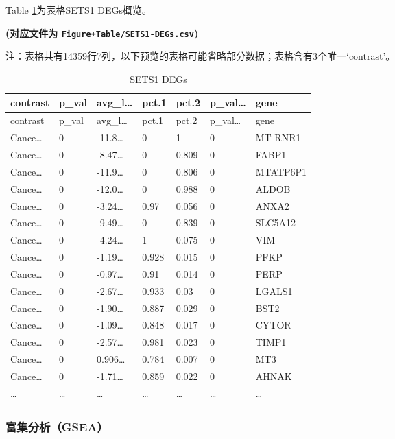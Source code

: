 \documentclass[
]{article}
\begin{document}
Table \ref{tab:SETS1-DEGs}为表格SETS1 DEGs概览。

\textbf{(对应文件为 \texttt{Figure+Table/SETS1-DEGs.csv})}

\begin{center}\begin{tcolorbox}[colback=gray!10, colframe=gray!50, width=0.9\linewidth, arc=1mm, boxrule=0.5pt]注：表格共有14359行7列，以下预览的表格可能省略部分数据；表格含有3个唯一`contrast'。
\end{tcolorbox}
\end{center}

\begin{longtable}[]{@{}lllllll@{}}
\caption{\label{tab:SETS1-DEGs}SETS1 DEGs}\tabularnewline
\toprule
contrast & p\_val & avg\_l\ldots{} & pct.1 & pct.2 & p\_val\ldots{} & gene\tabularnewline
\midrule
\endfirsthead
\toprule
contrast & p\_val & avg\_l\ldots{} & pct.1 & pct.2 & p\_val\ldots{} & gene\tabularnewline
\midrule
\endhead
Cance\ldots{} & 0 & -11.8\ldots{} & 0 & 1 & 0 & MT-RNR1\tabularnewline
Cance\ldots{} & 0 & -8.47\ldots{} & 0 & 0.809 & 0 & FABP1\tabularnewline
Cance\ldots{} & 0 & -11.9\ldots{} & 0 & 0.806 & 0 & MTATP6P1\tabularnewline
Cance\ldots{} & 0 & -12.0\ldots{} & 0 & 0.988 & 0 & ALDOB\tabularnewline
Cance\ldots{} & 0 & -3.24\ldots{} & 0.97 & 0.056 & 0 & ANXA2\tabularnewline
Cance\ldots{} & 0 & -9.49\ldots{} & 0 & 0.839 & 0 & SLC5A12\tabularnewline
Cance\ldots{} & 0 & -4.24\ldots{} & 1 & 0.075 & 0 & VIM\tabularnewline
Cance\ldots{} & 0 & -1.19\ldots{} & 0.928 & 0.015 & 0 & PFKP\tabularnewline
Cance\ldots{} & 0 & -0.97\ldots{} & 0.91 & 0.014 & 0 & PERP\tabularnewline
Cance\ldots{} & 0 & -2.67\ldots{} & 0.933 & 0.03 & 0 & LGALS1\tabularnewline
Cance\ldots{} & 0 & -1.90\ldots{} & 0.887 & 0.029 & 0 & BST2\tabularnewline
Cance\ldots{} & 0 & -1.09\ldots{} & 0.848 & 0.017 & 0 & CYTOR\tabularnewline
Cance\ldots{} & 0 & -2.57\ldots{} & 0.981 & 0.023 & 0 & TIMP1\tabularnewline
Cance\ldots{} & 0 & 0.906\ldots{} & 0.784 & 0.007 & 0 & MT3\tabularnewline
Cance\ldots{} & 0 & -1.71\ldots{} & 0.859 & 0.022 & 0 & AHNAK\tabularnewline
\ldots{} & \ldots{} & \ldots{} & \ldots{} & \ldots{} & \ldots{} & \ldots{}\tabularnewline
\bottomrule
\end{longtable}

\hypertarget{ux5bccux96c6ux5206ux6790gsea}{%
\subsubsection{富集分析（GSEA）}\label{ux5bccux96c6ux5206ux6790gsea}}
\end{document}
